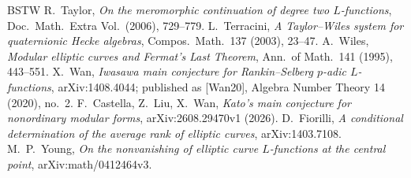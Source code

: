 \documentclass[11pt]{amsart}
\theoremstyle{definition}
\theoremstyle{remark}
\begin{document}
\begin{thebibliography}{BSTW}
 R.~Taylor, \emph{On the meromorphic continuation of degree two $L$-functions}, Doc.\ Math.\ Extra Vol.\ (2006), 729--779.
 L.~Terracini, \emph{A Taylor--Wiles system for quaternionic Hecke algebras}, Compos.\ Math.\ 137 (2003), 23--47.
 A.~Wiles, \emph{Modular elliptic curves and Fermat's Last Theorem}, Ann.\ of Math.\ 141 (1995), 443--551.
 X.~Wan, \emph{Iwasawa main conjecture for Rankin--Selberg $p$-adic $L$-functions}, arXiv:1408.4044; published as [Wan20], Algebra Number Theory 14 (2020), no.~2.
 F.~Castella, Z.~Liu, X.~Wan, \emph{Kato's main conjecture for nonordinary modular forms}, arXiv:2608.29470v1 (2026).
 D.~Fiorilli, \emph{A conditional determination of the average rank of elliptic curves}, arXiv:1403.7108.
 M.~P.~Young, \emph{On the nonvanishing of elliptic curve $L$-functions at the central point}, arXiv:math/0412464v3.
\end{thebibliography}
\end{document}
